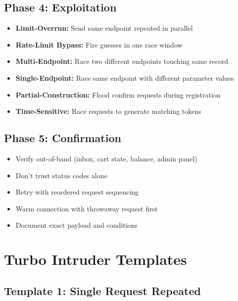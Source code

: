 \documentclass[11pt]{article}
\begin{document}
\begin{checklistbox}
\subsection*{Phase 4: Exploitation}
\begin{itemize}
    \item[$\square$] \textbf{Limit-Overrun:} Send same endpoint repeated in parallel
    \item[$\square$] \textbf{Rate-Limit Bypass:} Fire guesses in one race window
    \item[$\square$] \textbf{Multi-Endpoint:} Race two different endpoints touching same record
    \item[$\square$] \textbf{Single-Endpoint:} Race same endpoint with different parameter values
    \item[$\square$] \textbf{Partial-Construction:} Flood confirm requests during registration
    \item[$\square$] \textbf{Time-Sensitive:} Race requests to generate matching tokens
\end{itemize}

\subsection*{Phase 5: Confirmation}
\begin{itemize}
    \item[$\square$] Verify out-of-band (inbox, cart state, balance, admin panel)
    \item[$\square$] Don't trust status codes alone
    \item[$\square$] Retry with reordered request sequencing
    \item[$\square$] Warm connection with throwaway request first
    \item[$\square$] Document exact payload and conditions
\end{itemize}
\end{checklistbox}

\section{Turbo Intruder Templates}

\subsection{Template 1: Single Request Repeated}
\end{document}
